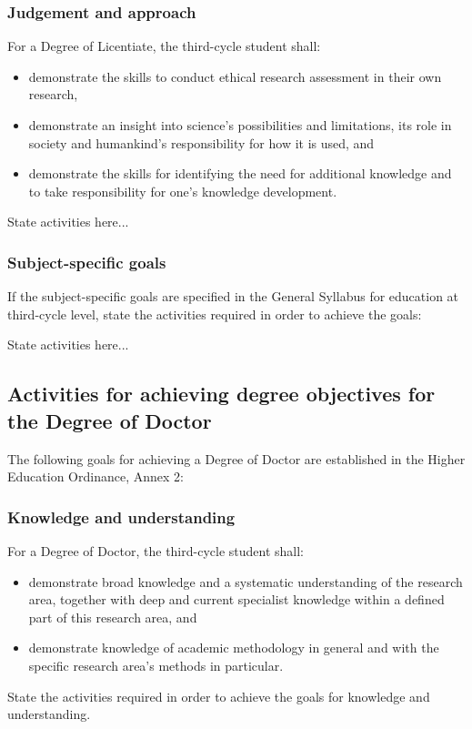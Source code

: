 \subsubsection*{Judgement and approach}
For a Degree of Licentiate, the third-cycle student shall:
\begin{itemize}
	\item demonstrate the skills to conduct ethical research assessment in their own research,
	\item demonstrate an insight into science's possibilities and limitations, its role in society and humankind's responsibility for how it is used, and
	\item demonstrate the skills for identifying the need for additional knowledge and to take responsibility for one's knowledge development.
\end{itemize}

\colorbox{lgray}{
\begin{minipage}[t]{\textwidth}

State activities here...

\end{minipage}}

\subsubsection*{Subject-specific goals}
If the subject-specific goals are specified in the General Syllabus for education at third-cycle level, state the activities required in order to achieve the goals:

\colorbox{lgray}{
\begin{minipage}[t]{\textwidth}

State activities here...

\end{minipage}}

\subsection{Activities for achieving degree objectives for the Degree of Doctor}
The following goals for achieving a Degree of Doctor are established in the Higher Education Ordinance, Annex 2:

\subsubsection*{Knowledge and understanding}
For a Degree of Doctor, the third-cycle student shall:
\begin{itemize}
	\item demonstrate broad knowledge and a systematic understanding of the research area, together with deep and current specialist knowledge within a defined part of this research area, and
	\item demonstrate knowledge of academic methodology in general and with the specific research area's methods in particular.
\end{itemize}
State the activities required in order to achieve the goals for knowledge and understanding.

